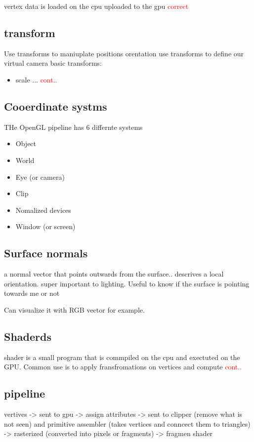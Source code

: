 vertex data is loaded on the cpu uploaded to the gpu \textcolor{red}{correct}

\subsection*{transform}
Use transforms to maniuplate positions orentation
use transforms to define our virtual camera
basic transforms:

\begin{itemize}
	\item scale ... \textcolor{red}{cont..} 
\end{itemize}


\subsection*{Cooerdinate systms}

THe OpenGL pipeline has 6 differnte systems

\begin{itemize}
	\item Object 
	\item World
	\item Eye (or camera)
	\item Clip
	\item Nomalized devices
	\item Window (or screen)
\end{itemize}

\subsection*{Surface normals}
a normal vector that points outwards from the surface..
descrives a local orientation. super important to lighting. Useful to know if the surface is pointing towards me or not 

Can visualize it with RGB vector for example.

\subsection*{Shaderds}
shader is a small program that is commpiled on the cpu and exectuted on the GPU. Common use is to apply fransfromations on vertices and compute 
\textcolor{red}{cont..} 

\subsection*{pipeline}
vertives -> sent to gpu -> assign attributes -> sent to clipper (remove what is not seen) and primitive assembler (takes vertices and conncect them to triangles) -> rasterized (converted into pixels or fragments) -> fragmen shader

